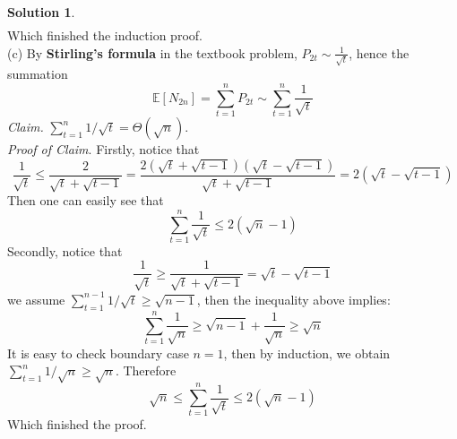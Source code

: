 \documentclass[a4paper, 10pt]{article}
\theoremstyle{definition}
\theoremstyle{hSol}
\newtheorem*{solution}{Solution}
\begin{document}
\begin{solution}
\begin{equation}
\begin{split}
  \end{split}
\end{equation}
Which finished the induction proof.  \\
(c) By \textbf{Stirling’s formula} in the textbook problem, $P_{2t}\sim \frac{1}{\sqrt{t}}$, hence the summation
\begin{equation}
  \mathbb{E}\left[N_{2n}\right] = \sum_{t=1}^n P_{2t} \sim \sum_{t=1}^n \frac{1}{\sqrt{t}}
\end{equation}
\textit{Claim.} $\sum_{t=1}^n 1/\sqrt{t}=\Theta(\sqrt{n})$. \\
\textit{Proof of Claim}. Firstly, notice that
\begin{equation}
  \frac{1}{\sqrt{t}} \leq \frac{2}{\sqrt{t}+\sqrt{t-1}} = \frac{2(\sqrt{t} + \sqrt{t-1})(\sqrt{t}-\sqrt{t-1})}{\sqrt{t}+\sqrt{t-1}} = 2(\sqrt{t} - \sqrt{t-1})
\end{equation}
Then one can easily see that 
\begin{equation}
  \sum_{t=1}^n \frac{1}{\sqrt{t}} \leq 2(\sqrt{n}-1)
\end{equation}
Secondly, notice that
\begin{equation}
  \frac{1}{\sqrt{t}} \geq \frac{1}{\sqrt{t}+\sqrt{t-1}} = \sqrt{t} - \sqrt{t-1}
\end{equation}
we assume $\sum_{t=1}^{n-1} 1/\sqrt{t} \geq \sqrt{n-1}$, then the inequality above implies:
\begin{equation}
  \sum_{t=1}^{n}\frac{1}{\sqrt{n}} \geq \sqrt{n-1} + \frac{1}{\sqrt{n}} \geq \sqrt{n}
\end{equation}
It is easy to check boundary case $n=1$, then by induction, we obtain $\sum_{t=1}^{n}1/\sqrt{n} \geq \sqrt{n}$. Therefore
\begin{equation}
  \sqrt{n} \leq \sum_{t=1}^n \frac{1}{\sqrt{t}} \leq 2(\sqrt{n}-1)
\end{equation}
Which finished the proof.
\end{solution}
\end{document}
